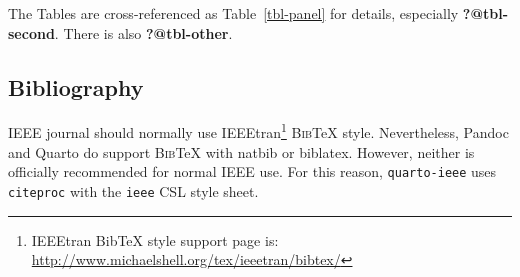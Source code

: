 \documentclass[
  journal,
]{IEEEtran}%
\theoremstyle{plain}
\theoremstyle{remark}
\begin{document}
\begin{table}

\caption{\label{tbl-panel}Main Caption}

\begin{minipage}{0.50\linewidth}



\end{minipage}%
%
\begin{minipage}{0.50\linewidth}



\end{minipage}%

\end{table}%

The Tables are cross-referenced as Table~\ref{tbl-panel} for details,
especially \textbf{?@tbl-second}. There is also \textbf{?@tbl-other}.

\subsection{Bibliography}\label{bibliography}

IEEE journal should normally use IEEEtran\footnote{IEEEtran BibTeX style
  support page is:
  \url{http://www.michaelshell.org/tex/ieeetran/bibtex/}}
\textsc{Bib}{\TeX} style. Nevertheless, Pandoc and Quarto do support
\textsc{Bib}{\TeX} with natbib or biblatex. However, neither is
officially recommended for normal IEEE use. For this reason,
\texttt{quarto-ieee} uses \texttt{citeproc} with the \texttt{ieee} CSL
style sheet.
\end{document}
